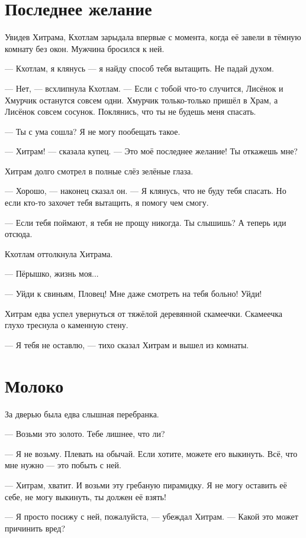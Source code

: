 \documentclass[a4paper,12pt,fleqn]{book}\usepackage{polyglossia}\setdefaultlanguage[babelshorthands=true]{russian}\setotherlanguage{english}\defaultfontfeatures{Ligatures=TeX,Mapping=tex-text}\usepackage{xcolor}\newcommand{\ml}[3]{#2}
\begin{document}
\section{Последнее желание}

Увидев Хитрама, Кхотлам зарыдала впервые с момента, когда её завели в тёмную комнату без окон.
Мужчина бросился к ней.

--- Кхотлам, я клянусь --- я найду способ тебя вытащить.
Не падай духом.

--- Нет, --- всхлипнула Кхотлам.
--- Если с тобой что-то случится, Лисёнок и Хмурчик останутся совсем одни.
Хмурчик только-только пришёл в Храм, а Лисёнок совсем сосунок.
Поклянись, что ты не будешь меня спасать.

--- Ты с ума сошла?
Я не могу пообещать такое.

--- Хитрам! --- сказала купец.
--- Это моё последнее желание!
Ты откажешь мне?

Хитрам долго смотрел в полные слёз зелёные глаза.

--- Хорошо, --- наконец сказал он.
--- Я клянусь, что не буду тебя спасать.
Но если кто-то захочет тебя вытащить, я помогу чем смогу.

--- Если тебя поймают, я тебя не прощу никогда.
Ты слышишь?
А теперь иди отсюда.

Кхотлам оттолкнула Хитрама.

--- Пёрышко, жизнь моя...

--- Уйди к свиньям, Пловец!
Мне даже смотреть на тебя больно!
Уйди!

Хитрам едва успел увернуться от тяжёлой деревянной скамеечки.
Скамеечка глухо треснула о каменную стену.

--- Я тебя не оставлю, --- тихо сказал Хитрам и вышел из комнаты.

\section{Молоко}

За дверью была едва слышная перебранка.

--- Возьми это золото.
Тебе лишнее, что ли?

--- Я не возьму.
Плевать на обычай.
Если хотите, можете его выкинуть.
Всё, что мне нужно --- это побыть с ней.

--- Хитрам, хватит.
И возьми эту гребаную пирамидку.
Я не могу оставить её себе, не могу выкинуть, ты должен её взять!

--- Я просто посижу с ней, пожалуйста, --- убеждал Хитрам.
--- Какой это может причинить вред?
\end{document}
